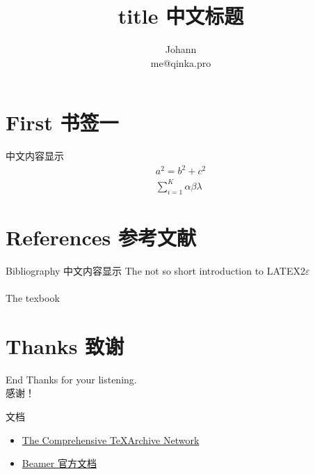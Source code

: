 \documentclass[10pt, mathserif]{beamer}
\begin{document}
    \title[abbreviation]{ title 中文标题}
    \author{ Johann \\ me@qinka.pro}


    \begin{frame}
        \titlepage	%
    \end{frame}

    \section{First 书签一}
    \begin{frame}
        中文内容显示
        \begin{align}
            a^2 = b^2 + c^2 \\
            \sum_{i=1}^{K} \alpha \beta \lambda
        \end{align}
    \end{frame}

    \section{References 参考文献}
    \begin{frame}[allowframebreaks]{Bibliography}
        中文内容显示
        The not so short introduction to LATEX2$\varepsilon$ \cite{Oetiker2015Latex} \\
        ~\\
        The texbook \cite{knuth1984texbook}
        \label{Reference}
    \end{frame}

    \section{Thanks 致谢}
    \begin{frame}{End}
        Thanks for your listening. \\
        感谢！
    \end{frame}

    \begin{frame}{文档}
        \begin{itemize}
            \item \href{https://www.ctan.org}{The Comprehensive \TeX Archive Network}
            \item \href{http://mirrors.ctan.org/macros/latex/contrib/beamer/doc/beameruserguide.pdf}%
                {Beamer 官方文档}
        \end{itemize}
    \end{frame}
\end{document}
